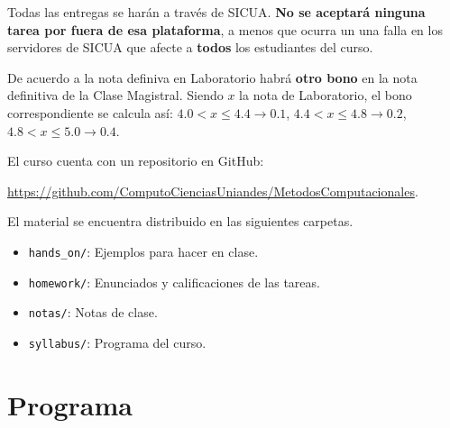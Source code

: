 \documentclass[11pt]{article}
\begin{document}
Todas las entregas se har\'an a trav\'es de SICUA. 
{\bf No se aceptar\'a ninguna tarea por fuera de esa plataforma}, a
menos que ocurra un una falla en los servidores de SICUA que afecte a
{\bf todos} los estudiantes del curso. 

De acuerdo a la nota definiva en Laboratorio habr\'a {\bf otro bono} en la
nota definitiva de la Clase Magistral. 
Siendo $x$ la nota de Laboratorio, el bono correspondiente
se calcula as\'i:
$4.0 < x \leq 4.4 \rightarrow 0.1$, $4.4< x\leq 4.8\rightarrow 0.2$, $4.8<x
\leq 5.0\rightarrow 0.4$.


El curso cuenta con un repositorio en GitHub:

\url{https://github.com/ComputoCienciasUniandes/MetodosComputacionales}. 

El material se
encuentra distribuido en las siguientes carpetas. 


\begin{itemize}
\item \texttt{hands\_on/}: Ejemplos para hacer en clase.
\item \texttt{homework/}: Enunciados y calificaciones de las tareas.
\item \texttt{notas/}: Notas de clase.
\item \texttt{syllabus/}: Programa del curso.

\end{itemize}
 
 
\newpage
\section*{Programa}
\end{document}

